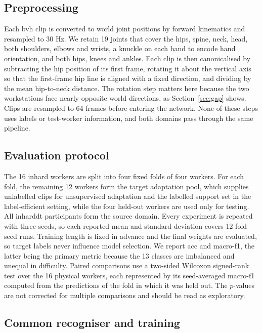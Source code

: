 \documentclass[Afour,sagev,times]{sagej}
\begin{document}
\subsection{Preprocessing}

Each \ac{bvh} clip is converted to world joint positions by forward
kinematics and resampled to 30 Hz. We retain 19 joints that cover the hips,
spine, neck, head, both shoulders, elbows and wrists, a knuckle on each hand to
encode hand orientation, and both hips, knees and ankles. Each clip is then
canonicalised by subtracting the hip position of its first frame, rotating it
about the vertical axis so that the first-frame hip line is aligned with a
fixed direction, and dividing by the mean hip-to-neck distance. The rotation
step matters here because the two workstations face nearly opposite world
directions, as Section~\ref{sec:gap} shows. Clips are resampled to 64 frames
before entering the network. None of these steps uses labels or test-worker
information, and both domains pass through the same pipeline.

\subsection{Evaluation protocol}

The 16 \ac{inhard} workers are split into four fixed folds of four workers.
For each fold, the remaining 12 workers form the target adaptation pool, which
supplies unlabelled clips for unsupervised adaptation and the labelled support
set in the label-efficient setting, while the four held-out workers are used
only for testing. All \ac{inharddt} participants form the source domain. Every
experiment is repeated with three seeds, so each reported mean and standard
deviation covers 12 fold-seed runs. Training length is fixed in advance and
the final weights are evaluated, so target labels never influence model
selection. We report \ac{acc} and macro-\ac{f1}, the latter being the primary
metric because the 13 classes are imbalanced and unequal in difficulty. Paired
comparisons use a two-sided Wilcoxon signed-rank test over the 16 physical
workers, each represented by its seed-averaged macro-\ac{f1} computed from the
predictions of the fold in which it was held out. The $p$-values are not
corrected for multiple comparisons and should be read as exploratory.

\subsection{Common recogniser and training}
\end{document}
